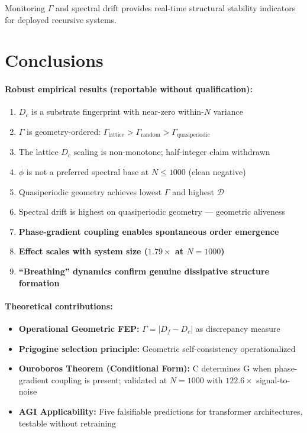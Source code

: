\documentclass[12pt,a4paper]{article}
\theoremstyle{plain}
\theoremstyle{definition}
\begin{document}
Monitoring $\Gamma$ and spectral drift provides real-time structural
stability indicators for deployed recursive systems.

\section{Conclusions}
\label{sec:conclusions}

\paragraph{Robust empirical results (reportable without qualification):}
\begin{enumerate}
  \item $D_c$ is a substrate fingerprint with near-zero within-$N$
        variance
  \item $\Gamma$ is geometry-ordered:
        $\Gamma_{\text{lattice}} > \Gamma_{\text{random}} >
        \Gamma_{\text{quasiperiodic}}$
  \item The lattice $D_c$ scaling is non-monotone; half-integer claim
        withdrawn
  \item $\phi$ is not a preferred spectral base at $N \leq 1000$ (clean
        negative)
  \item Quasiperiodic geometry achieves lowest $\Gamma$ and highest
        $\mathcal{D}$
  \item Spectral drift is highest on quasiperiodic geometry --- geometric
        aliveness
  \item \textbf{Phase-gradient coupling enables spontaneous order
        emergence}
  \item \textbf{Effect scales with system size ($1.79\times$ at
        $N=1000$)}
  \item \textbf{``Breathing'' dynamics confirm genuine dissipative
        structure formation}
\end{enumerate}

\paragraph{Theoretical contributions:}
\begin{itemize}
  \item \textbf{Operational Geometric FEP:} $\Gamma = |D_f - D_c|$ as
        discrepancy measure
  \item \textbf{Prigogine selection principle:} Geometric
        self-consistency operationalized
  \item \textbf{Ouroboros Theorem (Conditional Form):} C determines G
        when phase-gradient coupling is present; validated at $N=1000$
        with $122.6\times$ signal-to-noise
  \item \textbf{AGI Applicability:} Five falsifiable predictions for
        transformer architectures, testable without retraining
\end{itemize}
\end{document}
